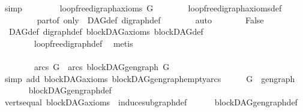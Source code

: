 \begin{isabellebody}
\ simp\isanewline
\ \ \ \ \isamarkupfalse%
\ \isamarkupfalse%
\ {\isachardoublequoteopen}{\isasymnot}\ loopfree{\isacharunderscore}{\kern0pt}digraph{\isacharunderscore}{\kern0pt}axioms\ G{\isachardoublequoteclose}\isanewline
\ \ \ \ \ \ \isamarkupfalse%
\ loopfree{\isacharunderscore}{\kern0pt}digraph{\isacharunderscore}{\kern0pt}axioms{\isacharunderscore}{\kern0pt}def\isanewline
\ \ \ \ \ \ \isamarkupfalse%
\ \ part{\isacharunderscore}{\kern0pt}of\ only\ \ DAG{\isacharunderscore}{\kern0pt}def\ digraph{\isacharunderscore}{\kern0pt}def\isanewline
\ \ \ \ \ \ \isamarkupfalse%
\ auto\isanewline
\ \ \ \ \isamarkupfalse%
\ \isamarkupfalse%
\ False\isanewline
\ \ \ \ \ \ \isamarkupfalse%
\ \ DAG{\isacharunderscore}{\kern0pt}def\ digraph{\isacharunderscore}{\kern0pt}def\ blockDAG{\isacharunderscore}{\kern0pt}axioms\ blockDAG{\isacharunderscore}{\kern0pt}def\isanewline
\ \ \ \ \ \ \ \ loopfree{\isacharunderscore}{\kern0pt}digraph{\isacharunderscore}{\kern0pt}def\ \isamarkupfalse%
\ metis\isanewline
\ \ \isamarkupfalse%
\ \ \ \ \ \ \ \ \ \ \ \ \ \ \ \ \ \ \ \ \ \ \ \ \ \ \ \ \ \ \ \ \ \ \ \ \ \ \ \ \ \ \ \ \ \ \ \ \ \ \ \ \ \ \ \ \ \ \ \ \ \ \ \ \ \ \ \ \ \ \ \ \ \ \isanewline
\ \ \isamarkupfalse%
\ \isamarkupfalse%
\ {\isachardoublequoteopen}arcs\ G\ {\isacharequal}{\kern0pt}\ arcs\ {\isacharparenleft}{\kern0pt}blockDAG{\isachardot}{\kern0pt}gen{\isacharunderscore}{\kern0pt}graph\ G{\isacharparenright}{\kern0pt}{\isachardoublequoteclose}\isanewline
\ \ \ \ \isamarkupfalse%
\ {\isacharparenleft}{\kern0pt}simp\ add{\isacharcolon}{\kern0pt}\ blockDAG{\isacharunderscore}{\kern0pt}axioms\ blockDAG{\isachardot}{\kern0pt}gen{\isacharunderscore}{\kern0pt}graph{\isacharunderscore}{\kern0pt}empty{\isacharunderscore}{\kern0pt}arcs{\isacharparenright}{\kern0pt}\isanewline
\ \ \isamarkupfalse%
\ \isamarkupfalse%
\ {\isachardoublequoteopen}G\ {\isacharequal}{\kern0pt}\ gen{\isacharunderscore}{\kern0pt}graph{\isachardoublequoteclose}\isanewline
\ \ \ \ \isamarkupfalse%
\ \ blockDAG{\isachardot}{\kern0pt}gen{\isacharunderscore}{\kern0pt}graph{\isacharunderscore}{\kern0pt}def\isanewline
\ \ \ \ \isamarkupfalse%
\ verts{\isacharunderscore}{\kern0pt}equal\ blockDAG{\isacharunderscore}{\kern0pt}axioms\ \ induce{\isacharunderscore}{\kern0pt}subgraph{\isacharunderscore}{\kern0pt}def\isanewline
\ \ \ \ \ \ blockDAG{\isachardot}{\kern0pt}gen{\isacharunderscore}{\kern0pt}graph{\isacharunderscore}{\kern0pt}def\ \isamarkupfalse%

\end{isabellebody}
